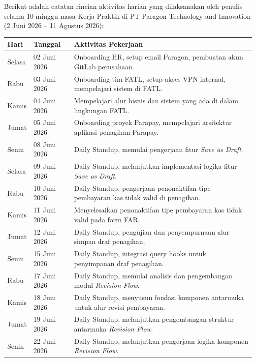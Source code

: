 Berikut adalah catatan rincian aktivitas harian yang dilaksanakan oleh penulis selama 10 minggu masa Kerja Praktik di PT Paragon Technology and Innovation (2 Juni 2026 -- 11 Agustus 2026):

\begin{center}
\begin{longtable}{|p{2.0cm}|p{2.5cm}|p{8.5cm}|}
\hline
\textbf{Hari} & \textbf{Tanggal} & \textbf{Aktivitas Pekerjaan} \\
\hline
\endhead

Selasa & 02 Juni 2026 & Onboarding HR, setup email Paragon, pembuatan akun GitLab perusahaan. \\ \hline
Rabu & 03 Juni 2026 & Onboarding tim FATL, setup akses VPN internal, mempelajari sistem di FATL. \\ \hline
Kamis & 04 Juni 2026 & Mempelajari alur bisnis dan sistem yang ada di dalam lingkungan FATL. \\ \hline
Jumat & 05 Juni 2026 & Onboarding proyek Parapay, mempelajari arsitektur aplikasi penagihan Parapay. \\ \hline
Senin & 08 Juni 2026 & Daily Standup, memulai pengerjaan fitur \textit{Save as Draft}. \\ \hline
Selasa & 09 Juni 2026 & Daily Standup, melanjutkan implementasi logika fitur \textit{Save as Draft}. \\ \hline
Rabu & 10 Juni 2026 & Daily Standup, pengerjaan penonaktifan tipe pembayaran kas tidak valid di penagihan. \\ \hline
Kamis & 11 Juni 2026 & Menyelesaikan penonaktifan tipe pembayaran kas tidak valid pada form FAR. \\ \hline
Jumat & 12 Juni 2026 & Daily Standup, pengujian dan penyempurnaan alur simpan draf penagihan. \\ \hline
Senin & 15 Juni 2026 & Daily Standup, integrasi query hooks untuk penyimpanan draf penagihan. \\ \hline
Rabu & 17 Juni 2026 & Daily Standup, memulai analisis dan pengembangan modul \textit{Revision Flow}. \\ \hline
Kamis & 18 Juni 2026 & Daily Standup, menyusun fondasi komponen antarmuka untuk alur revisi pembayaran. \\ \hline
Jumat & 19 Juni 2026 & Daily Standup, melanjutkan pengembangan struktur antarmuka \textit{Revision Flow}. \\ \hline
Senin & 22 Juni 2026 & Daily Standup, melanjutkan pengerjaan logika komponen \textit{Revision Flow}. \\ \hline

\end{longtable}
\end{center}
